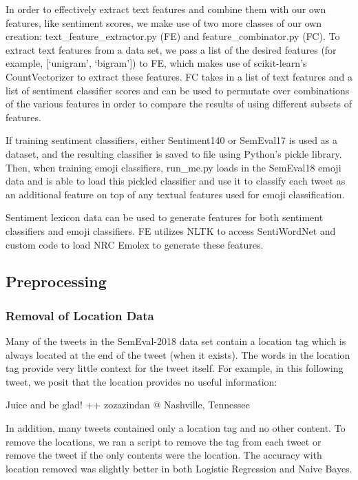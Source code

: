 \documentclass[11pt]{article}
\begin{document}
In order to effectively extract text features and combine them with our own features, like sentiment scores, we make use of two more classes of our own creation: text\_feature\_extractor.py (FE) and feature\_combinator.py (FC). To extract text features from a data set, we pass a list of the desired features (for example, [`unigram', `bigram']) to FE, which makes use of scikit-learn's CountVectorizer to extract these features. FC takes in a list of text features and a list of sentiment classifier scores and can be used to permutate %
over combinations of the various features in order to compare the results of using different subsets of features.

If training sentiment classifiers, either Sentiment140 or SemEval17 is used as a dataset, and the resulting classifier is saved to file using Python's pickle library. Then, when training emoji classifiers, run\_me.py loads in the SemEval18 emoji data and is able to load this pickled classifier and use it to classify each tweet as an additional feature on top of any textual features used for emoji classification.

Sentiment lexicon data can be used to generate features for both sentiment classifiers and emoji classifiers. FE utilizes NLTK to access SentiWordNet and custom code to load NRC Emolex to generate these features.

\subsection{Preprocessing}

\subsubsection{Removal of Location Data}
Many of the tweets in the SemEval-2018 data set contain a location tag which is always located at the end of the tweet (when it exists). The words in the location tag provide very little context for the tweet itself.  For example, in this following tweet, we posit that the location provides no useful information:
\begin{center}
Juice and be glad! ++ zozazindan @ Nashville, Tennessee 
\end{center}
In addition, many tweets contained only a location tag and no other content. To remove the locations, we ran a script to remove the tag from each tweet or remove the tweet if the only contents were the location. The accuracy with location removed was slightly better in both Logistic Regression and Naive Bayes.
\end{document}
